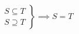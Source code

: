 \[  \left. \begin{gathered}
  S \subseteq T \\
  S \supseteq T
\end{gathered} \right\}
\implies S = T  \]
